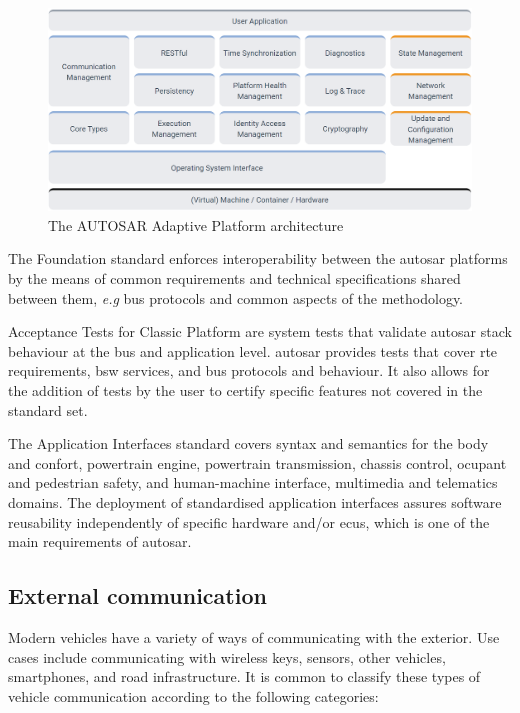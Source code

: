 \begin{figure}
    \centering
    \includegraphics[width = \linewidth]{img/parts/introduction/AUTOSAR Adaptive Platform.png}
    \caption{The AUTOSAR Adaptive Platform architecture \citep{autosar_adaptive_arch}}
    \label{fig:autosar_adaptive_arch}
\end{figure}

The Foundation standard enforces interoperability between the \gls{autosar} platforms by the means of common requirements and technical specifications shared between them, \textit{e.g} bus protocols and common aspects of the methodology.\par

Acceptance Tests for Classic Platform are system tests that validate \gls{autosar} stack behaviour at the bus and application level. \gls{autosar} provides tests that cover \gls{rte} requirements, \gls{bsw} services, and bus protocols and behaviour. It also allows for the addition of tests by the user to certify specific features not covered in the standard set.\par

The Application Interfaces standard covers syntax and semantics for the body and confort, powertrain engine, powertrain transmission, chassis control, ocupant and pedestrian safety, and human-machine interface, multimedia and telematics domains. The deployment of standardised application interfaces assures software reusability independently of specific hardware and/or \glspl{ecu}, which is one of the main requirements of \gls{autosar}.

\subsection{External communication}

Modern vehicles have a variety of ways of communicating with the exterior. Use cases include communicating with wireless keys, sensors, other vehicles, smartphones, and road infrastructure. It is common to classify these types of vehicle communication according to the following categories:

